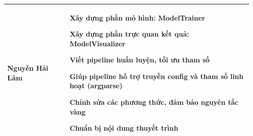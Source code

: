 \documentclass[12pt,a4paper]{article}
\begin{document}
\begin{table}[h!]
\begin{tabularx}{\textwidth}{|
        >{\centering\arraybackslash}m{4cm}|   
        >{\centering\arraybackslash}m{2.5cm}| 
        >{\raggedright\arraybackslash}X|      
    }
    Nguyễn Hải Lâm & 23280068 & 
    \begin{dashlist}
        \item Xây dựng phần mô hình: ModelTrainer
        \item Xây dựng phần trực quan kết quả: ModelVisualizer
        \item Viết pipeline huấn luyện, tối ưu tham số
        \item Giúp pipeline hỗ trợ truyền config và tham số linh hoạt (argparse)
        \item Chỉnh sửa các phương thức, đảm bảo nguyên tắc vàng
        \item Chuẩn bị nội dung thuyết trình
    \end{dashlist}
    \\ \hline

    \end{tabularx}
\end{table}
\end{document}
